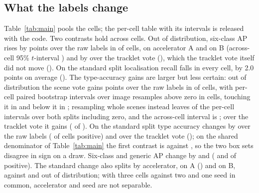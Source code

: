 \documentclass{article}
\begin{document}
\subsection{What the labels change}
Table~\ref{tab:main} pools the cells; the per-cell table with its intervals is released with the code. Two contrasts hold across cells. Out of distribution, six-class AP rises by \SvSixOODVsRawGain{} points over the raw labels in \SvSixOODVsRawPos{} of \SvCells{} cells, \SvOODGainA{} on accelerator A and \SvOODGainB{} on B (across-cell 95\% $t$-interval \SvSixOODVsRawCI) and by \SvSixOODVsTrkGain{} over the tracklet vote (\SvSixOODVsTrkCI), which the tracklet vote itself did not move (\SvSixOODTrkVsRawGain). On the standard split localisation recall falls in every cell, by 2.0 points on average (\SvRecStdVsRawCI). The type-accuracy gains are larger but less certain: out of distribution the scene vote gains \SvTypeOODVsRawGain{} points over the raw labels in \SvTypeOODVsRawPos{} of \SvCells{} cells, with per-cell paired bootstrap intervals over \SvBootDraws{} image resamples above zero in \SvOODAbove{} cells, touching it in \SvOODStraddle{} and below it in \SvOODBelow{}; resampling whole scenes instead leaves \SceneBootZero{} of the \SceneBootCells{} per-cell intervals over both splits including zero, and the across-cell interval is \SvTypeOODVsRawCI; over the tracklet vote it gains \SvTypeOODVsTrkGain{} (\SvTypeOODVsTrkPos{} of \SvCells). On the standard split type accuracy changes by \SvTypeStdVsRawGain{} over the raw labels (\SvTypeStdVsRawPos{} of \SvCells{} cells positive) and \SvTypeStdVsTrkGain{} over the tracklet vote (\SvTypeStdVsTrkPos{}); on the shared denominator of Table~\ref{tab:main} the first contrast is \TblSvStdType{} against \TblRawStdType, so the two box sets disagree in sign on a draw. Six-class and generic AP change by \SvSixStdVsRawGain{} and \SvGenStdVsRawGain{} (\SvSixStdVsRawPos{} and \SvGenStdVsRawPos{} of \SvCells{} positive). The standard change also splits by accelerator, \SvStdGainA{} on A (\SvStdCIA) and \SvStdGainB{} on B, against \SvOODGainA{} and \SvOODGainB{} out of distribution; with three cells against two and one seed in common, accelerator and seed are not separable.
\end{document}
